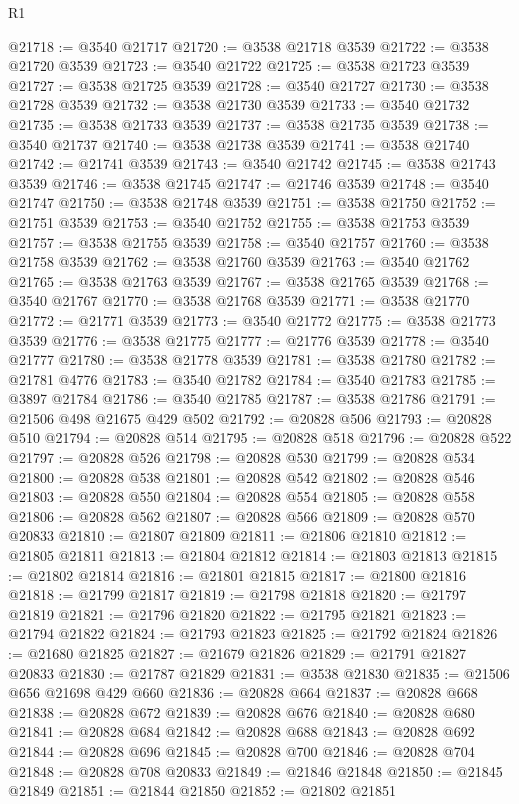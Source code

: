 \begin{lexlean}{R1}
\begin{coremodule}
@21718 := @3540 @21717
@21720 := @3538 @21718 @3539
@21722 := @3538 @21720 @3539
@21723 := @3540 @21722
@21725 := @3538 @21723 @3539
@21727 := @3538 @21725 @3539
@21728 := @3540 @21727
@21730 := @3538 @21728 @3539
@21732 := @3538 @21730 @3539
@21733 := @3540 @21732
@21735 := @3538 @21733 @3539
@21737 := @3538 @21735 @3539
@21738 := @3540 @21737
@21740 := @3538 @21738 @3539
@21741 := @3538 @21740
@21742 := @21741 @3539
@21743 := @3540 @21742
@21745 := @3538 @21743 @3539
@21746 := @3538 @21745
@21747 := @21746 @3539
@21748 := @3540 @21747
@21750 := @3538 @21748 @3539
@21751 := @3538 @21750
@21752 := @21751 @3539
@21753 := @3540 @21752
@21755 := @3538 @21753 @3539
@21757 := @3538 @21755 @3539
@21758 := @3540 @21757
@21760 := @3538 @21758 @3539
@21762 := @3538 @21760 @3539
@21763 := @3540 @21762
@21765 := @3538 @21763 @3539
@21767 := @3538 @21765 @3539
@21768 := @3540 @21767
@21770 := @3538 @21768 @3539
@21771 := @3538 @21770
@21772 := @21771 @3539
@21773 := @3540 @21772
@21775 := @3538 @21773 @3539
@21776 := @3538 @21775
@21777 := @21776 @3539
@21778 := @3540 @21777
@21780 := @3538 @21778 @3539
@21781 := @3538 @21780
@21782 := @21781 @4776
@21783 := @3540 @21782
@21784 := @3540 @21783
@21785 := @3897 @21784
@21786 := @3540 @21785
@21787 := @3538 @21786
@21791 := @21506 @498 @21675 @429 @502
@21792 := @20828 @506
@21793 := @20828 @510
@21794 := @20828 @514
@21795 := @20828 @518
@21796 := @20828 @522
@21797 := @20828 @526
@21798 := @20828 @530
@21799 := @20828 @534
@21800 := @20828 @538
@21801 := @20828 @542
@21802 := @20828 @546
@21803 := @20828 @550
@21804 := @20828 @554
@21805 := @20828 @558
@21806 := @20828 @562
@21807 := @20828 @566
@21809 := @20828 @570 @20833
@21810 := @21807 @21809
@21811 := @21806 @21810
@21812 := @21805 @21811
@21813 := @21804 @21812
@21814 := @21803 @21813
@21815 := @21802 @21814
@21816 := @21801 @21815
@21817 := @21800 @21816
@21818 := @21799 @21817
@21819 := @21798 @21818
@21820 := @21797 @21819
@21821 := @21796 @21820
@21822 := @21795 @21821
@21823 := @21794 @21822
@21824 := @21793 @21823
@21825 := @21792 @21824
@21826 := @21680 @21825
@21827 := @21679 @21826
@21829 := @21791 @21827 @20833
@21830 := @21787 @21829
@21831 := @3538 @21830
@21835 := @21506 @656 @21698 @429 @660
@21836 := @20828 @664
@21837 := @20828 @668
@21838 := @20828 @672
@21839 := @20828 @676
@21840 := @20828 @680
@21841 := @20828 @684
@21842 := @20828 @688
@21843 := @20828 @692
@21844 := @20828 @696
@21845 := @20828 @700
@21846 := @20828 @704
@21848 := @20828 @708 @20833
@21849 := @21846 @21848
@21850 := @21845 @21849
@21851 := @21844 @21850
@21852 := @21802 @21851

\end{coremodule}
\end{lexlean}
